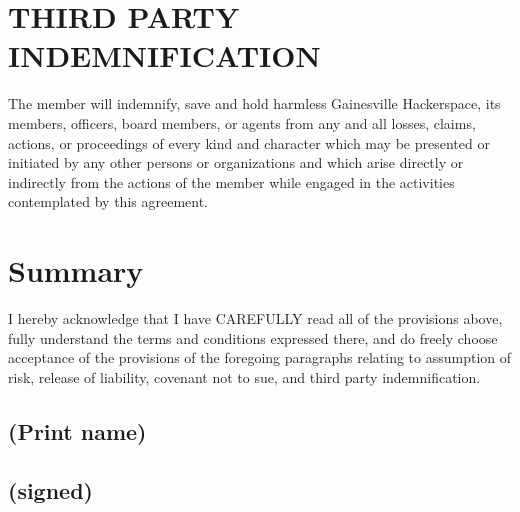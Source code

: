 \documentclass[article,letterpaper,times,12pt,listings-bw,microtype]{article}
\begin{document}
\section{THIRD PARTY INDEMNIFICATION}
\label{sec-4}

The member will indemnify, save and hold harmless Gainesville
Hackerspace, its members, officers, board members, or agents from any
and all losses, claims, actions, or proceedings of every kind and
character which may be presented or initiated by any other persons or
organizations and which arise directly or indirectly from the actions
of the member while engaged in the activities contemplated by this
agreement.

\section{Summary}
\label{sec-5}


I hereby acknowledge that I have CAREFULLY read all of the provisions
above, fully understand the terms and conditions expressed there, and
do freely choose acceptance of the provisions of the foregoing
paragraphs relating to assumption of risk, release of liability,
covenant not to sue, and third party indemnification.


\subsection{(Print name)}
\label{sec-5-1}
\subsection{(signed)}
\label{sec-5-2}
\end{document}
